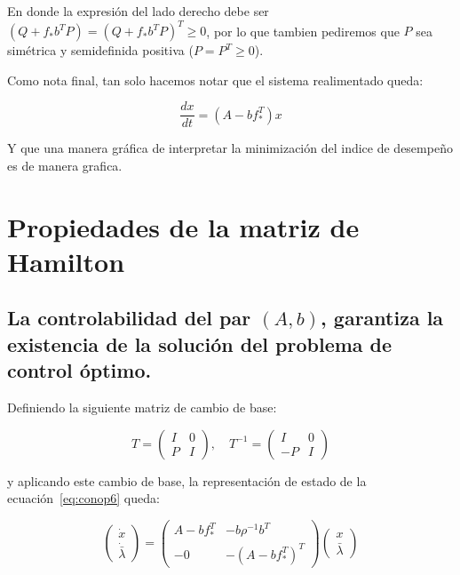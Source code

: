     En donde la expresión del lado derecho debe ser $\left( Q + f_* b^T P \right) = \left( Q + f_* b^T P \right)^T \ge 0$, por lo que tambien pediremos que $P$ sea simétrica y semidefinida positiva ($P = P^T \ge 0$).

    Como nota final, tan solo hacemos notar que el sistema realimentado queda:

    \begin{equation}
        \frac{dx}{dt} = (A - b f_*^T) x
    \end{equation}

    Y que una manera gráfica de interpretar la minimización del indice de desempeño es de manera grafica.


    \section{Propiedades de la matriz de Hamilton}

        \subsection{La controlabilidad del par $(A, b)$, garantiza la existencia de la solución del problema de control óptimo.}

        Definiendo la siguiente matriz de cambio de base:

        \begin{equation}
            T =
            \begin{pmatrix}
                I & 0 \\
                P & I
            \end{pmatrix}, \quad T^{-1} =
            \begin{pmatrix}
                I & 0 \\
                -P & I
            \end{pmatrix}
        \end{equation}

        y aplicando este cambio de base, la representación de estado de la ecuación~\ref{eq:conop6} queda:

        \begin{equation} \label{eq:conop10}
            \begin{pmatrix}
                \dot{x} \\
                \dot{\bar{\lambda}}
            \end{pmatrix} =
            \begin{pmatrix}
                A - b f_*^T & -b \rho^{-1} b^T \\
                -0 & - (A - b f_*^T)^T
            \end{pmatrix}
            \begin{pmatrix}
                x \\
                \bar{\lambda}
            \end{pmatrix}
        \end{equation}

